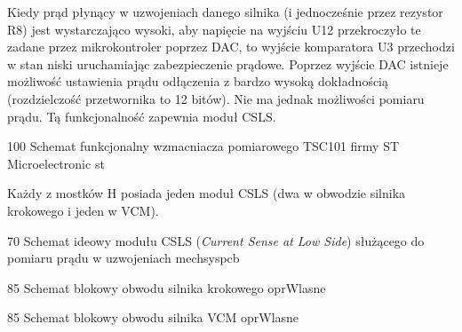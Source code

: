 Kiedy prąd płynący w uzwojeniach danego silnika (i jednocześnie przez rezystor R8) jest wystarczająco wysoki, aby napięcie na wyjściu U12 przekroczyło te zadane przez mikrokontroler poprzez DAC, to wyjście komparatora U3 przechodzi w stan niski uruchamiając zabezpieczenie prądowe. Poprzez wyjście DAC istnieje możliwość ustawienia prądu odłączenia z bardzo wysoką dokładnością (rozdzielczość przetwornika to 12 bitów). Nie ma jednak możliwości pomiaru prądu. Tą funkcjonalność zapewnia moduł CSLS.

	{100}
	{Schemat funkcjonalny wzmacniacza pomiarowego TSC101 firmy ST Microelectronic}
	{st}


Każdy z mostków H posiada jeden moduł CSLS (dwa w obwodzie silnika krokowego i jeden w VCM). 


	{70}
	{Schemat ideowy modułu CSLS ({\it Current Sense at Low Side}) służącego do pomiaru prądu w uzwojeniach}
	{mechsyspcb}

	{85}
	{Schemat blokowy obwodu silnika krokowego}
	{oprWlasne}
	
	{85}
	{Schemat blokowy obwodu silnika VCM}
	{oprWlasne}



\clearpage














